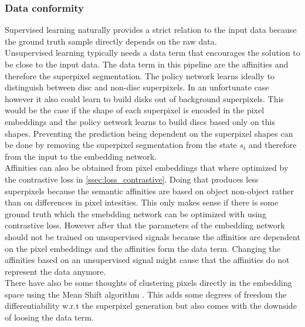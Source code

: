 \subsubsection{Data conformity}
Supervised learning naturally provides a strict relation to the input data because the ground truth sample directly depends on the raw data.\\
Unsupervised learning typically needs a data term that encourages the solution to be close to the input data. The data term in this pipeline are the affinities and therefore the superpixel segmentation. The policy network learns ideally to distinguish between disc and non-disc superpixels. In an unfortunate case however it also could learn to build disks out of background superpixels. This would be the case if the shape of each superpixel is encoded in the pixel embeddings and the policy network learns to build discs based only on this shapes. Preventing the prediction being dependent on the superpixel shapes can be done by removing the superpixel segmentation from the state $s_t$ and therefore from the input to the embedding network.\\
Affinities can also be obtained from pixel embeddings that where optimized by the contrastive loss in \ref{ssec:loss_contrastive}. Doing that produces less superpixels because the semantic affinities are based on object non-object rather than on differences in pixel intesities. This only makes sense if there is some ground truth which the emebdding network can be optimized with using contrastive loss. However after that the parameters of the embedding network should not be trained on unsupervised signals because the affinities are dependent on the pixel embeddings and the affinities form the data term. Changing the affinities based on an unsupervised signal might cause that the affinities do not represent the data anymore.\\
There have also be some thoughts of clustering pixels directly in the embedding space using the Mean Shift algorithm \cite{400568}. This adds some degrees of freedom the differentiability w.r.t the superpixel generation but also comes with the downside of loosing the data term.\\



